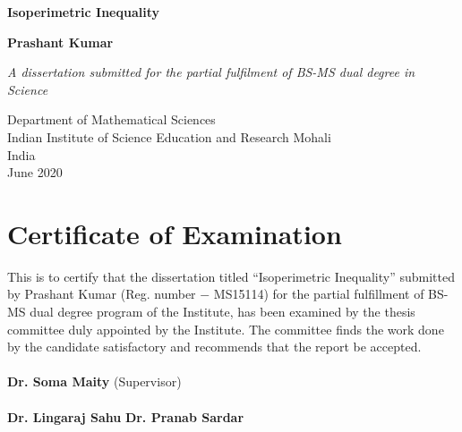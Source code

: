 \documentclass[oneside]{book}
\date{\today}
\begin{document}
\begin{titlepage}
    \begin{center}
        \vspace*{1cm}
            
        \Huge
        \textbf{Isoperimetric Inequality}
            
        \vspace{0.5cm}
        \LARGE
    
            
        \vspace{1.5cm}
            
        \textbf{Prashant Kumar}
            
        \vfill
            
        \textit{A dissertation submitted for the partial fulfilment of BS-MS dual degree in Science}          
        \vspace{0.9cm}
            
                    
        \Large
        Department of Mathematical Sciences\\
        Indian Institute of Science Education and Research Mohali\\
        India\\
        June 2020
            
    \end{center}
\end{titlepage}





\tableofcontents
 

\thispagestyle{empty}
\chapter*{Certificate of Examination}

This is to certify that the dissertation titled \enquote{Isoperimetric Inequality} submitted by Prashant Kumar (Reg. number $-$ MS15114) for the partial fulfillment of BS-MS dual degree program of the Institute, has been examined by the thesis committee duly appointed by the Institute. The committee finds the work done by the candidate satisfactory and recommends that the report be accepted.\\\\
\textbf{Dr. Soma Maity} (Supervisor)\\
\\
 \textbf{Dr. Lingaraj Sahu}  \hfill           \textbf{ Dr. Pranab Sardar}\\
\\
\\
\thispagestyle{empty}
 
\end{document}
